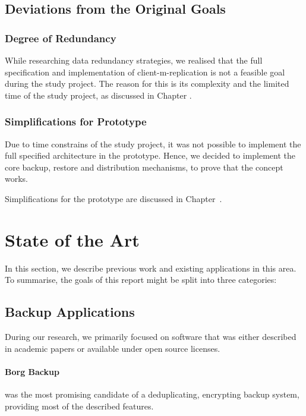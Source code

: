 \subsection{Deviations from the Original Goals}\label{sec:deviations-from-original-goals}

\subsubsection{Degree of Redundancy}
While researching data redundancy strategies, we realised that the full specification and implementation of \gls{client-m-replication} is not a feasible goal during the study project. The reason for this is its complexity and the limited time of the study project, as discussed in Chapter .

\subsubsection{Simplifications for Prototype}
Due to time constrains of the study project, it was not possible to implement the full specified architecture in the prototype. Hence, we decided to implement the core backup, restore and distribution mechanisms, to prove that the concept works.

Simplifications for the prototype are discussed in Chapter~.

\section{State of the Art}
In this section, we describe previous work and existing applications in this area. To summarise, the goals of this report might be split into three categories:

\subsection{Backup Applications}
During our research, we primarily focused on software that was either described in academic papers or available under open source licenses.

\paragraph{Borg Backup} \cite{borg-backup} was the most promising candidate of a deduplicating, encrypting backup system, providing most of the described features.

